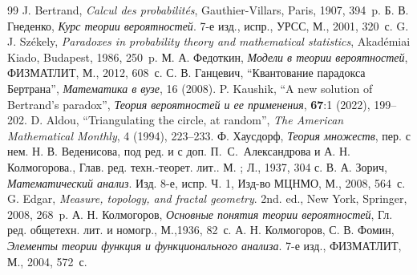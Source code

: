 \documentclass[12pt]{article}
\begin{document}
\begin{thebibliography}{99}
  J. Bertrand, \textit{Calcul des probabilit\'es}, Gauthier-Villars, Paris, 1907, 394~p.
  Б. В.  Гнеденко, \textit{Курс теории вероятностей}. 7-е изд., испр., УРСС, М.,
  2001, 320~с.
  G. J. Sz\'ekely, \textit{Paradoxes in probability theory and mathematical
  statistics}, Akad\'emiai Kiado, Budapest, 1986, 250~p.
   М. А. Федоткин, \textit{Модели в теории вероятностей}, ФИЗМАТЛИТ, М., 2012, 608~с.
  С. В. Ганцевич, ``Квантование парадокса Бертрана'', \textit{Математика в
    вузе}, 16 (2008).%
  P. Kaushik, ``A new solution of Bertrand's paradox'',  \textit{Теория вероятностей и ее
  применения}, \textbf{67}:1 (2022), 199--202.  
   D. Aldou, ``Triangulating the circle, at random'', \textit{ The American Mathematical
  Monthly}, 4 (1994), 223--233.
  Ф. Хаусдорф, \textit{Теория множеств},  пер. с нем. Н. В. Веденисова,
  под ред. и с доп. П.~С.~Александрова и А. Н. Колмогорова.,
  Глав. ред. техн.-теорет. лит.. М. ; Л., 1937, 304 с.
  В. А. Зорич, \textit{Математический анализ}. Изд. 8-е, испр. Ч. 1, Изд-во
  МЦНМО,  М., 2008, 564~с.
   G. Edgar,  \textit{Measure, topology, and fractal geometry}. 2nd. ed., New
   York, Springer, 2008, 268~p.
  А. Н. Колмогоров, \textit{Основные понятия теории вероятностей},
  Гл. ред. общетехн. лит. и номогр., М.,1936, 82~с.
  А. Н. Колмогоров, С. В. Фомин, \textit{ Элементы теории функция и
    функционального анализа}. 7-е изд.,  ФИЗМАТЛИТ, М., 2004, 572~с.
\end{thebibliography}
\end{document}
